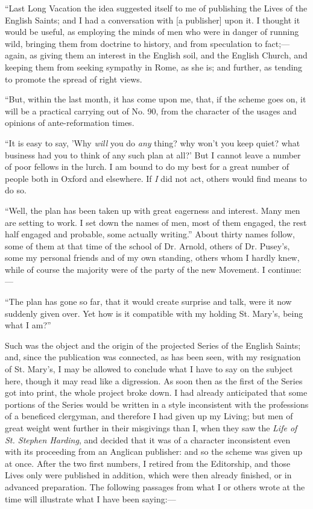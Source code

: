 ``Last Long Vacation the idea suggested itself to me of
publishing the Lives of the English Saints; and I had a conversation
with [a publisher] upon it. I thought it would be useful, as
employing the minds of men who were in danger of running wild, bringing
them from doctrine to history, and from speculation to fact;—again, as
giving them an interest in the English soil, and the English Church, and
keeping them from seeking sympathy in Rome, as she is; and further, as
tending to promote the spread of right views.

``But, within the last month, it has come upon me, that, if the
scheme goes on, it will be a practical carrying out of No. 90, from the
character of the usages and opinions of ante-reformation times.

``It is easy to say, 'Why \emph{will} you do \emph{any} thing?
why won't you keep quiet? what business had you to think of any such
plan at all?' But I cannot leave a number of poor fellows in the lurch.
I am bound to do my best for a great number of people both in Oxford and
elsewhere. If \emph{I} did not act, others would find means to do so.

``Well, the plan has been taken up with great eagerness and
interest. Many men are setting to work. I set down the names of men,
most of them engaged, the rest half engaged and probable, some actually
writing.'' About thirty names follow, some of them at that time of
the school of Dr. Arnold, others of Dr. Pusey's, some my personal
friends and of my own standing, others whom I hardly knew, while of
course the majority were of the party of the new Movement. I continue:—

``The plan has gone so far, that it would create surprise and
talk, were it now suddenly given over. Yet how is it compatible with my
holding St. Mary's, being what I am?''

Such was the object and the origin of the projected Series of the
English Saints; and, since the publication was connected, as has
been seen, with my resignation of St. Mary's, I may be allowed to
conclude what I have to say on the subject here, though it may read like a digression. As soon then as the first of the Series got
into print, the whole project broke down. I had already anticipated that
some portions of the Series would be written in a style inconsistent
with the professions of a beneficed clergyman, and therefore I had given
up my Living; but men of great weight went further in their
misgivings than I, when they saw the \emph{Life of St. Stephen Harding},
and decided that it was of a character inconsistent
even with its proceeding from an Anglican
publisher: and so the scheme was given up at once. After the two first
numbers, I retired from the Editorship, and those Lives only
were published in addition, which were then already finished, or in
advanced preparation. The following passages from what I or others wrote
at the time will illustrate what I have been saying:—

